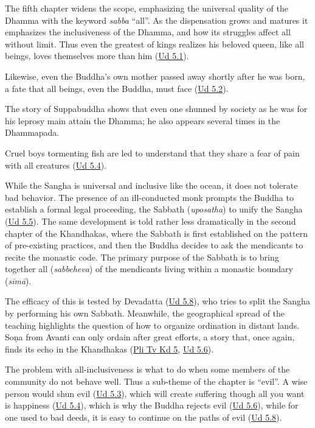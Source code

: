 \documentclass[12pt,openany]{book}%
\begin{document}
The fifth chapter widens the scope, emphasizing the universal quality of the Dhamma with the keyword \textit{sabba} “all”. As the dispensation grows and matures it emphasizes the inclusiveness of the Dhamma, and how its struggles affect all without limit. Thus even the greatest of kings realizes his beloved queen, like all beings, loves themselves more than him (\href{https://suttacentral.net/ud5.1/en/sujato}{Ud 5.1}). 

Likewise, even the Buddha’s own mother passed away shortly after he was born, a fate that all beings, even the Buddha, must face (\href{https://suttacentral.net/ud5.2/en/sujato}{Ud 5.2}). 

The story of Suppabuddha shows that even one shunned by society as he was for his leprosy main attain the Dhamma; he also appears several times in the Dhammapada.

 Cruel boys tormenting fish are led to understand that they share a fear of pain with all creatures (\href{https://suttacentral.net/ud5.4/en/sujato}{Ud 5.4}). 

 While the Sangha is universal and inclusive like the ocean, it does not tolerate bad behavior. The presence of an ill-conducted monk prompts the Buddha to establish a formal legal proceeding, the Sabbath (\textit{uposatha}) to unify the Sangha (\href{https://suttacentral.net/ud5.5/en/sujato}{Ud 5.5}). The same development is told rather less dramatically in the second chapter of the Khandhakas, where the Sabbath is first established on the pattern of pre-existing practices, and then the Buddha decides to ask the mendicants to recite the monastic code. The primary purpose of the Sabbath is to bring together all (\textit{sabbeheva}) of the mendicants living within a monastic boundary (\textit{\textsanskrit{sīmā}}). 

 The efficacy of this is tested by Devadatta (\href{https://suttacentral.net/ud5.8/en/sujato}{Ud 5.8}), who tries to split the Sangha by performing his own Sabbath. Meanwhile, the geographical spread of the teaching highlights the question of how to organize ordination in distant lands. \textsanskrit{Soṇa} from Avanti can only ordain after great efforts, a story that, once again, finds its echo in the Khandhakas (\href{https://suttacentral.net/pli-tv-kd5/en/brahmali}{Pli Tv Kd 5}, \href{https://suttacentral.net/ud5.6/en/sujato}{Ud 5.6}). 

 The problem with all-inclusiveness is what to do when some members of the community do not behave well. Thus a sub-theme of the chapter is “evil”. A wise person would shun evil (\href{https://suttacentral.net/ud5.3/en/sujato}{Ud 5.3}), which will create suffering though all you want is happiness (\href{https://suttacentral.net/ud5.4/en/sujato}{Ud 5.4}), which is why the Buddha rejects evil (\href{https://suttacentral.net/ud5.6/en/sujato}{Ud 5.6}), while for one used to bad deeds, it is easy to continue on the paths of evil (\href{https://suttacentral.net/ud5.8/en/sujato}{Ud 5.8}).
\end{document}

